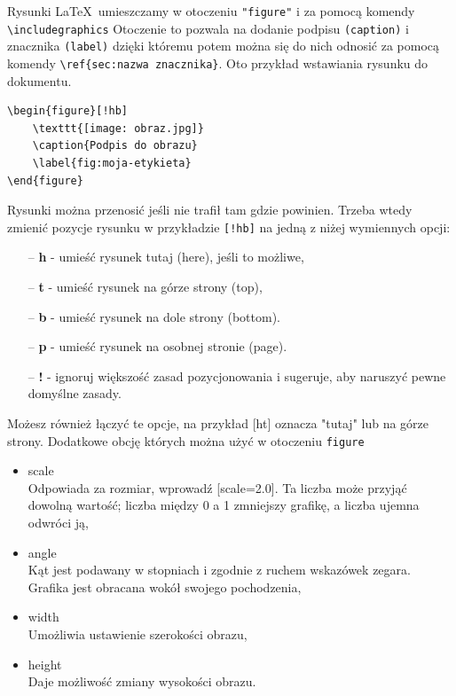 Rysunki \LaTeX\ umieszczamy w otoczeniu \texttt{"figure"} i za pomocą komendy \texttt{\textbackslash includegraphics} Otoczenie to pozwala na dodanie podpisu \texttt{(caption)} i znacznika \texttt{(label)} dzięki któremu potem można się do nich odnosić za pomocą komendy \texttt{\textbackslash ref\{sec:nazwa znacznika\}}.
Oto przykład wstawiania rysunku do dokumentu.
\begin{lstlisting}[caption={Kod wstawiający prosty rysunek}, label=lst:Kod wstawiający prosty rysunek]
\begin{figure}[!hb]
    \texttt{[image: obraz.jpg]}
    \caption{Podpis do obrazu}
    \label{fig:moja-etykieta}
\end{figure}
\end{lstlisting}
Rysunki można przenosić jeśli nie trafił tam gdzie powinien. Trzeba wtedy zmienić pozycje rysunku w przykładzie \texttt{[!hb]} na jedną z niżej wymiennych opcji:
\begin{itemize}
\item [--] \textbf{h} - umieść rysunek tutaj (here), jeśli to możliwe,
\item [--] \textbf{t} - umieść rysunek na górze strony (top),
\item [--] \textbf{b} - umieść rysunek na dole strony (bottom).
\item [--] \textbf{p} - umieść rysunek na osobnej stronie (page).
\item [--] \textbf{!} - ignoruj większość zasad pozycjonowania i sugeruje, aby naruszyć pewne domyślne zasady.
\end{itemize}
Możesz również łączyć te opcje, na przykład [ht] oznacza "tutaj" lub na górze strony.
Dodatkowe obcję których można użyć w otoczeniu \texttt{figure}
\begin{itemize}
\item scale\\
Odpowiada za rozmiar, wprowadź [scale=2.0]. Ta liczba może przyjąć dowolną wartość; liczba między 0 a 1 zmniejszy grafikę, a liczba ujemna odwróci ją,

\item angle\\
 Kąt jest podawany w stopniach i zgodnie z ruchem wskazówek zegara. Grafika jest obracana wokół swojego pochodzenia,
\item width\\
Umożliwia ustawienie szerokości obrazu,
\item height\\
Daje możliwość zmiany wysokości obrazu.
\end{itemize}

